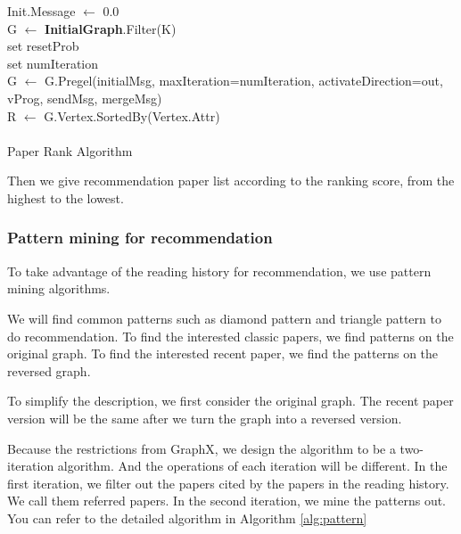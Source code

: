 \begin{algorithm}
Init.Message $\gets$ 0.0\\
G $\gets$ \textbf{InitialGraph}.Filter(K)\\
set resetProb\\
set numIteration\\
 G $\gets$ G.Pregel(initialMsg, maxIteration=numIteration, activateDirection=out, vProg, sendMsg, mergeMsg)\\
R $\gets$ G.Vertex.SortedBy(Vertex.Attr)\\
\\
 \caption{Paper Rank Algorithm}
 \label{alg:pagerank}
\end{algorithm}

Then we give recommendation paper list according to the ranking score, from the highest to the lowest.

\subsubsection{Pattern mining for recommendation}

To take advantage of the reading history for recommendation, we use pattern mining algorithms. 

We will find common patterns such as diamond pattern and triangle pattern to do recommendation. To find the interested classic papers, we find patterns on the original graph. To find the interested recent paper, we find the patterns on the reversed graph.

To simplify the description, we first consider the original graph. The recent paper version will be the same after we turn the graph into a reversed version.

Because the restrictions from GraphX, we design the algorithm to be a two-iteration algorithm. And the operations of each iteration will be different. In the first iteration, we filter out the papers cited by the papers in the reading history. We call them referred papers. In the second iteration, we mine the patterns out. You can refer to the detailed algorithm in Algorithm \ref{alg:pattern}

